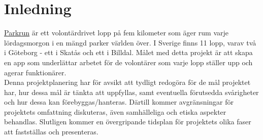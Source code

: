 \section{Inledning} 
\href{https://www.parkrun.se/}{Parkrun} är ett volontärdrivet lopp på fem kilometer som äger rum varje lördagsmorgon i en mängd parker världen över. I Sverige finns 11 lopp, varav två i Göteborg - ett i Skatås och ett i Billdal. Målet med detta projekt är att skapa en app som underlättar arbetet för de volontärer som varje lopp ställer upp och agerar funktionärer. \\
Denna projektplanering har för avsikt att tydligt redogöra för de mål projektet har, hur dessa mål är tänkta att uppfyllas, samt eventuella förutsedda svårigheter och hur dessa kan förebyggas/hanteras. Därtill kommer avgränsningar för projektets omfattning diskuteras, även samhälleliga och etiska aspekter behandlas. Slutligen kommer en övergripande tidsplan för projektets olika faser att fastställas och presenteras.
